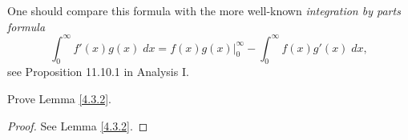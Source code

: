 \begin{remark}\label{4.3.3}
    One should compare this formula with the more well-known \emph{integration by parts formula}
    \[
        \int_0^\infty f'(x) g(x) \; dx = f(x) g(x) |_0^\infty - \int_0^\infty f(x) g'(x) \; dx,
    \]
    see Proposition 11.10.1 in Analysis I.
\end{remark}

\exercisesection

\begin{exercise}\label{ex 4.3.1}
    Prove Lemma \ref{4.3.2}.
\end{exercise}

\begin{proof}
    See Lemma \ref{4.3.2}.
\end{proof}